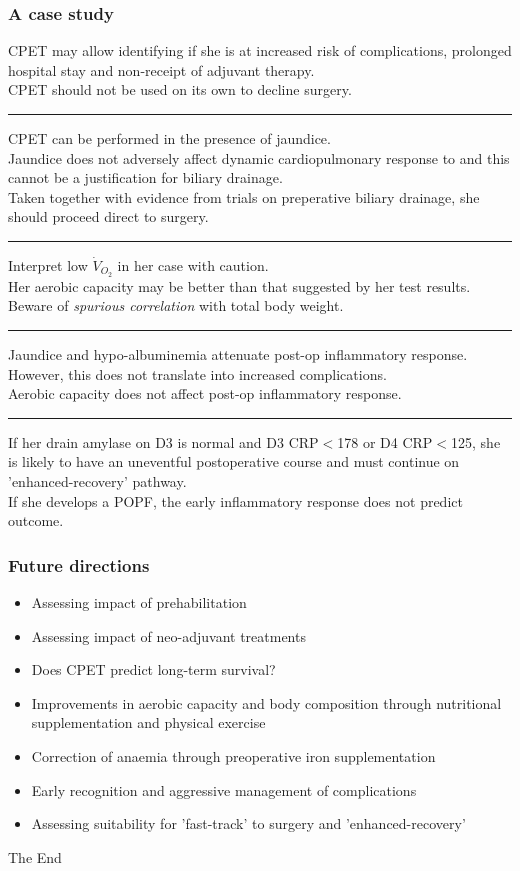 \documentclass[10pt]{beamer}
\begin{document}
\begin{frame}
	\frametitle{A case study}
	\begin{description}
	{\scriptsize 	
		\item [Ch 2] CPET may allow identifying if she is at increased risk of complications, prolonged hospital stay and non-receipt of adjuvant therapy. 
					\\ CPET should not be used on its own to decline surgery. 
					\hrule
		\item [Ch 3] CPET can be performed in the presence of jaundice. 
					\\ Jaundice does not adversely affect dynamic cardiopulmonary response to and this cannot be a justification for biliary drainage. 
					\\ Taken together with evidence from trials on preperative biliary drainage, she should proceed direct to surgery.
						\hrule
		\item [Ch 4] Interpret low $\dot{V}_{O_2}$ in her case with caution. 
					\\ Her aerobic capacity may be better than that suggested by her test results. 
					\\ Beware of \textit{spurious correlation} with total body weight.
						\hrule
		\item [Ch 5] Jaundice and hypo-albuminemia attenuate post-op inflammatory response.
					\\ However, this does not translate into increased complications. 
					\\ Aerobic capacity does not affect post-op inflammatory response.
						\hrule
		\item [Ch 6] If her drain amylase on D3 is normal and D3 CRP$<$178 or D4 CRP$<$125, she is likely to have an uneventful postoperative course and must continue on 'enhanced-recovery' pathway.
				\\ If she develops a POPF, the early inflammatory response does not predict outcome.
	}
	\end{description}
\end{frame}

\begin{frame}
	\frametitle{Future directions}
	\begin{itemize}
		\item Assessing impact of prehabilitation
		\item Assessing impact of neo-adjuvant treatments
		\item Does CPET predict long-term survival?
		\item Improvements in aerobic capacity and body composition through nutritional supplementation and physical exercise
		\item Correction of anaemia through preoperative iron supplementation
		\item Early recognition and aggressive management of complications
		\item Assessing suitability for 'fast-track' to surgery and 'enhanced-recovery'
	\end{itemize}
	

\end{frame}



\begin{frame}
\Huge{\centerline{The End}}
\end{frame}

\end{document}
